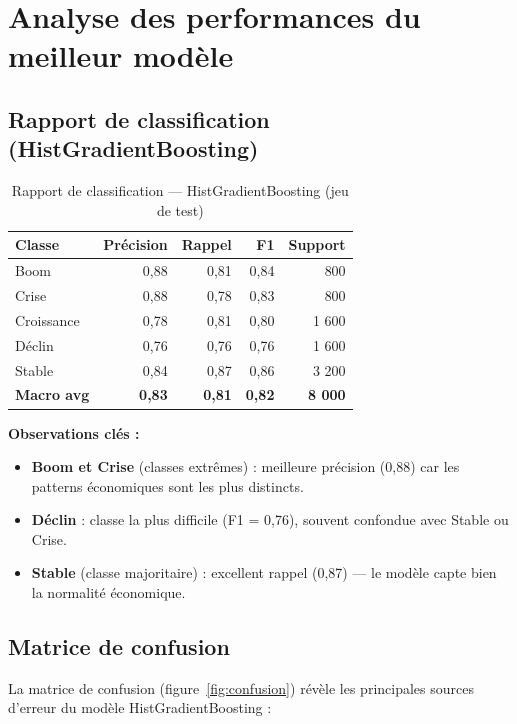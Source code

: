 \section{Analyse des performances du meilleur modèle}

\subsection{Rapport de classification (HistGradientBoosting)}

\begin{table}[H]
\centering
\caption{Rapport de classification — HistGradientBoosting (jeu de test)}
\label{tab:classif_report}
\begin{tabular}{lrrrr}
\toprule
\textbf{Classe} & \textbf{Précision} & \textbf{Rappel} & \textbf{F1} & \textbf{Support} \\
\midrule
Boom       & 0,88 & 0,81 & 0,84 &   800 \\
Crise      & 0,88 & 0,78 & 0,83 &   800 \\
Croissance & 0,78 & 0,81 & 0,80 & 1 600 \\
Déclin     & 0,76 & 0,76 & 0,76 & 1 600 \\
Stable     & 0,84 & 0,87 & 0,86 & 3 200 \\
\midrule
\textbf{Macro avg} & \textbf{0,83} & \textbf{0,81} & \textbf{0,82} & \textbf{8 000} \\
\bottomrule
\end{tabular}
\end{table}

\textbf{Observations clés :}
\begin{itemize}
  \item \textbf{Boom et Crise} (classes extrêmes) : meilleure précision (0,88) car les
    patterns économiques sont les plus distincts.
  \item \textbf{Déclin} : classe la plus difficile (F1 = 0,76), souvent confondue
    avec Stable ou Crise.
  \item \textbf{Stable} (classe majoritaire) : excellent rappel (0,87) — le modèle
    capte bien la normalité économique.
\end{itemize}

\subsection{Matrice de confusion}

La matrice de confusion (figure~\ref{fig:confusion}) révèle les principales sources
d'erreur du modèle HistGradientBoosting :

